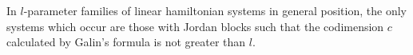 In $l$-parameter families of linear hamiltonian systems in general position, the only systems which occur are those with Jordan blocks such that the codimension $c$ calculated by Galin's formula is not greater than $l$.
